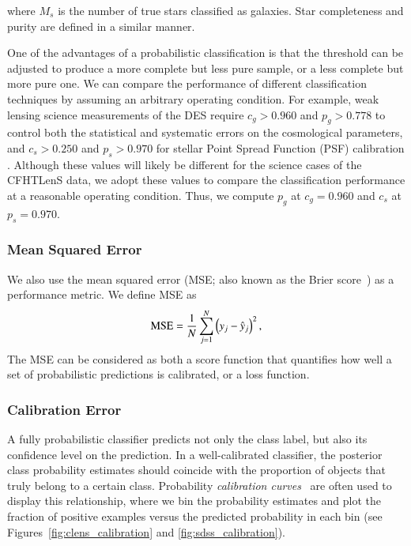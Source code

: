 \documentclass[fleqn,usenatbib]{mnras}
\begin{document}
\noindent
where $M_s$ is the number of true stars classified as galaxies.
Star completeness and purity are defined in a similar manner.


One of the advantages of a probabilistic classification is
that the threshold can be adjusted to produce
a more complete but less pure sample,
or a less complete but more pure one.
We can compare the performance of different classification techniques
by assuming an arbitrary operating condition.
For example, weak lensing science measurements
of the DES require $c_g > 0.960$ and $p_g > 0.778$
to control both the statistical and systematic errors
on the cosmological parameters,
and $c_s > 0.250$ and $p_s > 0.970$
for stellar Point Spread Function (PSF) calibration
\citep{soumagnac2013star}.
Although these values will likely be different
for the science cases of the CFHTLenS data,
we adopt these values to compare the classification performance
at a reasonable operating condition.
Thus, we compute $p_{g}$ at $c_g=0.960$
and $c_{s}$ at $p_s=0.970$.

\subsubsection{Mean Squared Error}

We also use the mean squared error
(MSE; also known as the Brier score~\citep{brier1950verification})
as a performance metric. We define MSE as
\begin{equation} \label{eq:mse}
  {\mathrm{MSE}} = \frac{1}{N} \sum^{N}_{j=1}
  \left( y_j - \hat{y}_j \right)^2,
\end{equation}
The MSE can be considered as both a score function that quantifies
how well a set of probabilistic predictions is calibrated,
or a loss function.

\subsubsection{Calibration Error}

A fully probabilistic classifier predicts not only the class label,
but also its confidence level on the prediction.
In a well-calibrated classifier, the posterior class probability estimates
should coincide with the proportion of objects that truly belong to a certain class.
Probability \textit{calibration curves}~\citep[or reliability curves;][]{degroot1983comparison}
are often used to display this relationship,
where we bin the probability estimates and plot the
fraction of positive examples versus the predicted probability in each bin
(see Figures~\ref{fig:clens_calibration} and \ref{fig:sdss_calibration}).
\end{document}
